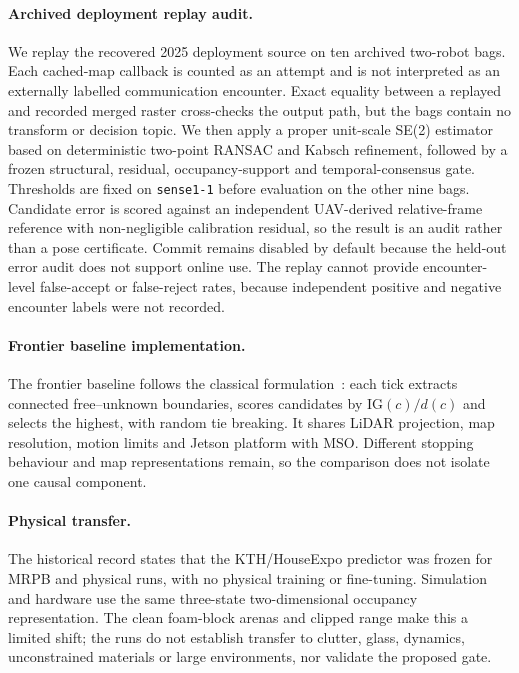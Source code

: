 \documentclass[11pt]{article}
\begin{document}
\paragraph{Archived deployment replay audit.}\label{app:deployment-replay}
We replay the recovered 2025 deployment source on ten archived two-robot bags. Each cached-map callback is counted as an attempt and is not interpreted as an externally labelled communication encounter. Exact equality between a replayed and recorded merged raster cross-checks the output path, but the bags contain no transform or decision topic. We then apply a proper unit-scale SE(2) estimator based on deterministic two-point RANSAC and Kabsch refinement, followed by a frozen structural, residual, occupancy-support and temporal-consensus gate. Thresholds are fixed on \texttt{sense1-1} before evaluation on the other nine bags. Candidate error is scored against an independent UAV-derived relative-frame reference with non-negligible calibration residual, so the result is an audit rather than a pose certificate. Commit remains disabled by default because the held-out error audit does not support online use. The replay cannot provide encounter-level false-accept or false-reject rates, because independent positive and negative encounter labels were not recorded.

\paragraph{Frontier baseline implementation.}
The frontier baseline follows the classical formulation~\citep{yamauchi1997frontier}: each tick extracts connected free--unknown boundaries, scores candidates by $\mathrm{IG}(c)/d(c)$ and selects the highest, with random tie breaking. It shares LiDAR projection, map resolution, motion limits and Jetson platform with MSO. Different stopping behaviour and map representations remain, so the comparison does not isolate one causal component.

\paragraph{Physical transfer.}
The historical record states that the KTH/HouseExpo predictor was frozen for MRPB and physical runs, with no physical training or fine-tuning. Simulation and hardware use the same three-state two-dimensional occupancy representation. The clean foam-block arenas and clipped range make this a limited shift; the runs do not establish transfer to clutter, glass, dynamics, unconstrained materials or large environments, nor validate the proposed gate.
\end{document}
